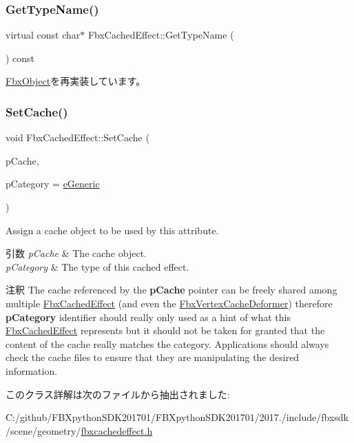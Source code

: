 \subsubsection{\texorpdfstring{Get\+Type\+Name()}{GetTypeName()}}
{\footnotesize\ttfamily virtual const char$\ast$ Fbx\+Cached\+Effect\+::\+Get\+Type\+Name (\begin{DoxyParamCaption}{ }\end{DoxyParamCaption}) const\hspace{0.3cm}{\ttfamily [virtual]}}



\hyperlink{class_fbx_object_a817dcfa8f7f7e2437324e1e71377c4b2}{Fbx\+Object}を再実装しています。

\mbox{\label{class_fbx_cached_effect_a4b31ce36a13bc43e6bfad32c6d9b7f7a}} 
\subsubsection{\texorpdfstring{Set\+Cache()}{SetCache()}}
{\footnotesize\ttfamily void Fbx\+Cached\+Effect\+::\+Set\+Cache (\begin{DoxyParamCaption}\item[{\hyperlink{class_fbx_cache}{Fbx\+Cache} $\ast$}]{p\+Cache,  }\item[{\hyperlink{class_fbx_cached_effect_ab402402f3e66d6e31eb3002b0bd58c33}{E\+Category}}]{p\+Category = {\ttfamily \hyperlink{class_fbx_cached_effect_ab402402f3e66d6e31eb3002b0bd58c33a301e356a3faecf6bea31b2ab220b3cf8}{e\+Generic}} }\end{DoxyParamCaption})}

Assign a cache object to be used by this attribute. 
\begin{DoxyParams}{引数}
{\em p\+Cache} & The cache object. \\
\hline
{\em p\+Category} & The type of this cached effect. \\
\hline
\end{DoxyParams}
\begin{DoxyRemark}{注釈}
The cache referenced by the {\bfseries p\+Cache} pointer can be freely shared among multiple \hyperlink{class_fbx_cached_effect}{Fbx\+Cached\+Effect} (and even the \hyperlink{class_fbx_vertex_cache_deformer}{Fbx\+Vertex\+Cache\+Deformer}) therefore {\bfseries p\+Category} identifier should really only used as a hint of what this \hyperlink{class_fbx_cached_effect}{Fbx\+Cached\+Effect} represents but it should not be taken for granted that the content of the cache really matches the category. Applications should always check the cache files to ensure that they are manipulating the desired information. 
\end{DoxyRemark}


このクラス詳解は次のファイルから抽出されました\+:\begin{DoxyCompactItemize}
\item 
C\+:/github/\+F\+B\+Xpython\+S\+D\+K201701/\+F\+B\+Xpython\+S\+D\+K201701/2017./include/fbxsdk/scene/geometry/\hyperlink{fbxcachedeffect_8h}{fbxcachedeffect.\+h}\end{DoxyCompactItemize}
